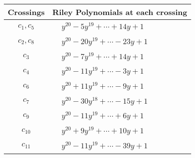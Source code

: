 \documentclass[1p]{elsarticle_modified}
\theoremstyle{definition}
\begin{document}
\begin{tabular}{m{50pt}|m{274pt}}
Crossings & \hspace{64pt}Riley Polynomials at each crossing \\
\hline $$\begin{aligned}c_{1},c_{5}\end{aligned}$$&$\begin{aligned}
&y^{20}-5 y^{19}+\cdots+14 y+1
\end{aligned}$\\
\hline $$\begin{aligned}c_{2},c_{8}\end{aligned}$$&$\begin{aligned}
&y^{20}-20 y^{19}+\cdots-23 y+1
\end{aligned}$\\
\hline $$\begin{aligned}c_{3}\end{aligned}$$&$\begin{aligned}
&y^{20}-7 y^{19}+\cdots+14 y+1
\end{aligned}$\\
\hline $$\begin{aligned}c_{4}\end{aligned}$$&$\begin{aligned}
&y^{20}-11 y^{19}+\cdots-3 y+1
\end{aligned}$\\
\hline $$\begin{aligned}c_{6}\end{aligned}$$&$\begin{aligned}
&y^{20}+11 y^{19}+\cdots-9 y+1
\end{aligned}$\\
\hline $$\begin{aligned}c_{7}\end{aligned}$$&$\begin{aligned}
&y^{20}-30 y^{18}+\cdots-15 y+1
\end{aligned}$\\
\hline $$\begin{aligned}c_{9}\end{aligned}$$&$\begin{aligned}
&y^{20}-11 y^{19}+\cdots+6 y+1
\end{aligned}$\\
\hline $$\begin{aligned}c_{10}\end{aligned}$$&$\begin{aligned}
&y^{20}+9 y^{19}+\cdots+10 y+1
\end{aligned}$\\
\hline $$\begin{aligned}c_{11}\end{aligned}$$&$\begin{aligned}
&y^{20}-11 y^{19}+\cdots-39 y+1
\end{aligned}$\\
\hline
\end{tabular}\\~\\
\end{document}
